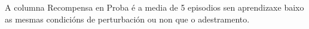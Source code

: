 \documentclass{article}
\begin{document}
A columna Recompensa en Proba é a media de 5 episodios sen aprendizaxe baixo as mesmas condicións de perturbación ou non que o adestramento. 

\newpage


\end{document}
